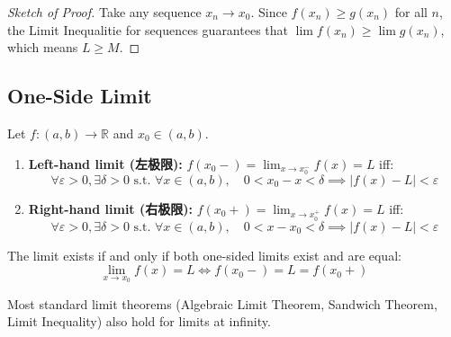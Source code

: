 \documentclass[
	UTF-8,
	11pt, %
	a4paper, %
]{LegrandOrangeBook}
\begin{document}
    \begin{proof}[Sketch of Proof]
    Take any sequence $x_n \to x_0$. Since $f(x_n) \ge g(x_n)$ for all $n$, 
    the Limit Inequalitie for sequences guarantees that $\lim f(x_n) \ge \lim g(x_n)$, 
    which means $L \ge M$.
    \end{proof}

    \subsection{One-Side Limit}

    \begin{definition}
    Let $f: (a, b) \to \mathbb{R}$ and $x_0 \in (a, b)$.

    \begin{enumerate}
        \item \textbf{Left-hand limit (左极限):} $f(x_0-) = \lim_{x \to x_0^-} f(x) = L$ iff:
        \[ \forall \varepsilon > 0, \exists \delta > 0 \text{ s.t. } \forall x \in (a, b), \quad 0 < x_0 - x < \delta \implies |f(x) - L| < \varepsilon \]
        
        \item \textbf{Right-hand limit (右极限):} $f(x_0+) = \lim_{x \to x_0^+} f(x) = L$ iff:
        \[ \forall \varepsilon > 0, \exists \delta > 0 \text{ s.t. } \forall x \in (a, b), \quad 0 < x - x_0 < \delta \implies |f(x) - L| < \varepsilon \]
    \end{enumerate}
    \end{definition}

    \begin{corollary}
    The limit exists if and only if both one-sided limits exist and are equal:
    \[ \lim_{x \to x_0} f(x) = L \iff f(x_0-) = L = f(x_0+) \]
    \end{corollary}

    \begin{remark}
    Most standard limit theorems (Algebraic Limit Theorem, Sandwich Theorem, Limit Inequality) also hold for limits at infinity.
    \end{remark}
\end{document}
